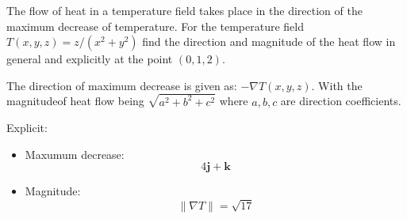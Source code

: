 The flow of heat in a temperature field takes place in the direction of the maximum decrease of temperature. For the temperature field $T\left(x,y,z\right)=z/\left(x^2+y^2\right)$ find the direction and magnitude of the heat flow in general and explicitly at the point $\left(0,1,2\right)$.

The direction of maximum decrease is given as: $-\nabla T\left(x,y,z\right)$. With the magnitudeof heat flow being $\sqrt{a^2+b^2+c^2}$ where $a,b,c$ are direction coefficients.
	\item Explicit:
		\begin{itemize}
			\item Maxumum decrease:
				\begin{equation*}
					\boxed{
					4\boldsymbol{j}+\boldsymbol{k}
					}
				\end{equation*}
			\item Magnitude:
				\begin{equation*}
				\boxed{
					\|\nabla T \| = \sqrt{17}
					}
				\end{equation*}
\end{itemize}
